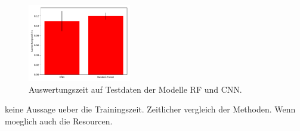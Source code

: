 \begin{figure}
		\centering
		\includegraphics[width=0.4\textwidth]{pictures/time.pdf}
		\caption{Auswertungszeit auf Testdaten der Modelle RF und CNN.}
		\label{fig:}
\end{figure}
keine Aussage ueber die Trainingszeit.
Zeitlicher vergleich der Methoden.
Wenn moeglich auch die Resourcen.

